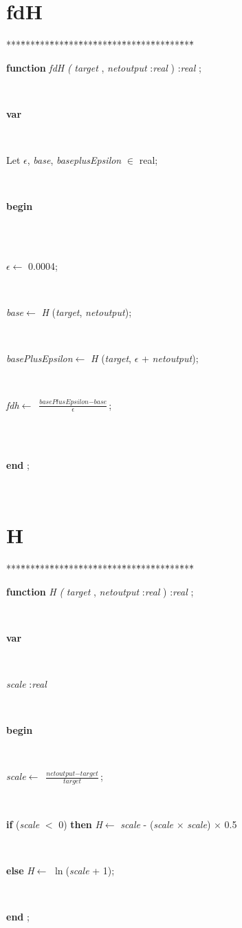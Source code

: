 \section{fdH}\label{sec:harmonyfdH}

\begin{tabbing}
***\=***\=***\=***\=***\=***\=***\=***\=***\=***\=***\=***\=***\=\kill
\parbox{14cm}{\textsf{\textbf{function}  \textit{fdH} \textit{(} \textit{target} ,  \textit{netoutput} :\textit{real} ) :\textit{real} ;}}\\
\+\parbox{14cm}{\textsf{\textbf{var} }}\\
\parbox{14cm}{\textsf{Let \textit{$\epsilon$}, \textit{base}, \textit{baseplusEpsilon} $\in$ real;}}\\
\-\<\+\parbox{14cm}{\textsf{\textbf{begin} }}\\
\\
\parbox{14cm}{\textsf{\textit{$\epsilon$}$\leftarrow$ 0.0004}; }\\
\parbox{14cm}{\textsf{\textit{base}$\leftarrow$ \textit{H} (\textit{target}, \textit{netoutput})}; }\\
\parbox{14cm}{\textsf{\textit{basePlusEpsilon}$\leftarrow$ \textit{H} (\textit{target}, \textit{$\epsilon$} + \textit{netoutput})}; }\\
\parbox{14cm}{\textsf{\textit{fdh}$\leftarrow$ $\frac{\textit{basePlusEpsilon} - \textit{base}}{\textit{$\epsilon$}}$}; }\\
\\
\<\-\parbox{14cm}{\textsf{\textbf{end} ;}}\\
\end{tabbing}
\section{H}\label{sec:harmonyH}

\begin{tabbing}
***\=***\=***\=***\=***\=***\=***\=***\=***\=***\=***\=***\=***\=\kill
\parbox{14cm}{\textsf{\textbf{function}  \textit{H} \textit{(}  \textit{target} ,  \textit{netoutput} :\textit{real} ) :\textit{real} ;}}\\
\+\parbox{14cm}{\textsf{\textbf{var} }}\\
\parbox{14cm}{\textsf{\textit{scale} :\textit{real} }}\\
\-\<\+\parbox{14cm}{\textsf{\textbf{begin} }}\\
\parbox{14cm}{\textsf{\textit{scale}$\leftarrow$ $\frac{\textit{netoutput} - \textit{target}}{\textit{target}}$}; }\\
\+\parbox{14cm}{\textsf {\textbf {if } \textsf{(\textit{scale} $<$ 0)} \textbf{ then } \textsf{\textit{H}$\leftarrow$ \textit{scale} - (\textit{scale} $\times$ \textit{scale}) $\times$ 0.5}}}\\
\-\<\parbox{14cm}{\textsf {\textbf {else } \textsf{\textit{H}$\leftarrow$ $\ln$(\textit{scale} + 1)}; }}\\
\<\-\parbox{14cm}{\textsf{\textbf{end} ;}}\\
\end{tabbing}
